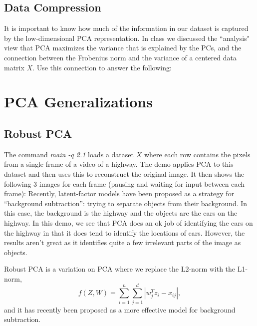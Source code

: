 \documentclass{article}
\begin{document}
\subsection{Data Compression}

It is important to know how much of the information in our dataset is captured by the low-dimensional PCA representation.
In class we discussed the ``analysis" view that PCA maximizes the variance that is explained by the PCs, and the connection between the Frobenius norm and the variance of a centered data matrix $X$. Use this connection to answer the following:


\section{PCA Generalizations}


\subsection{Robust PCA}

The command \emph{main -q 2.1} loads a dataset $X$ where each row contains the pixels from a single frame of a video of a highway. The demo applies PCA to this dataset and then uses this to reconstruct the original image. 
It then shows the following 3 images for each frame (pausing and waiting for input between each frame):
Recently, latent-factor models have been proposed as a strategy for ``background subtraction'': trying to separate objects from their background. In this case, the background is the highway and the objects are the cars on the highway. In this demo, we see that PCA does an ok job of identifying the cars on the highway in that it does tend to identify the locations of cars. However, the results aren't great as it identifies quite a few irrelevant parts of the image as objects.

Robust PCA is a variation on PCA where we replace the L2-norm with the L1-norm,
\[
f(Z,W) = \sum_{i=1}^n\sum_{j=1}^d |w_j^Tz_i - x_{ij}|,
\]
and it has recently been proposed as a more effective model for background subtraction. 
\end{document}
